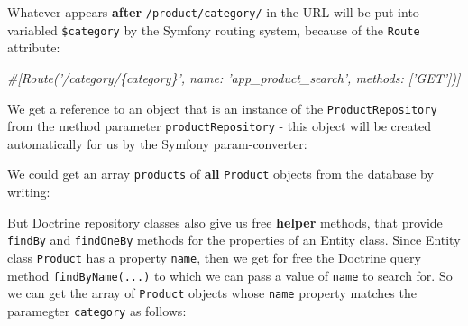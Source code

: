 \documentclass[a4paperpaper,openright]{book}
\newenvironment{Shaded}{}{}
\newcommand{\CommentTok}[1]{\textcolor[rgb]{0.38,0.63,0.69}{\textit{#1}}}
\newcommand{\KeywordTok}[1]{\textcolor[rgb]{0.00,0.44,0.13}{\textbf{#1}}}
\newcommand{\NormalTok}[1]{#1}
\newcommand{\OtherTok}[1]{\textcolor[rgb]{0.00,0.44,0.13}{#1}}
\begin{document}
Whatever appears \textbf{after} \texttt{/product/category/} in the URL
will be put into variabled \texttt{\$category} by the Symfony routing
system, because of the \texttt{Route} attribute:

\begin{Shaded}
\begin{Highlighting}[]
   \CommentTok{#[Route('/category/\{category\}', name: 'app_product_search', methods: ['GET'])]}
\end{Highlighting}
\end{Shaded}

We get a reference to an object that is an instance of the
\texttt{ProductRepository} from the method parameter
\texttt{productRepository} - this object will be created automatically
for us by the Symfony param-converter:

\begin{Shaded}
\end{Shaded}

We could get an array \texttt{products} of \textbf{all} \texttt{Product}
objects from the database by writing:

\begin{Shaded}
\end{Shaded}

But Doctrine repository classes also give us free \textbf{helper}
methods, that provide \texttt{findBy} and \texttt{findOneBy} methods for
the properties of an Entity class. Since Entity class \texttt{Product}
has a property \texttt{name}, then we get for free the Doctrine query
method \texttt{findByName(...)} to which we can pass a value of
\texttt{name} to search for. So we can get the array of \texttt{Product}
objects whose \texttt{name} property matches the paramegter
\texttt{category} as follows:

\begin{Shaded}
\end{Shaded}
\end{document}
